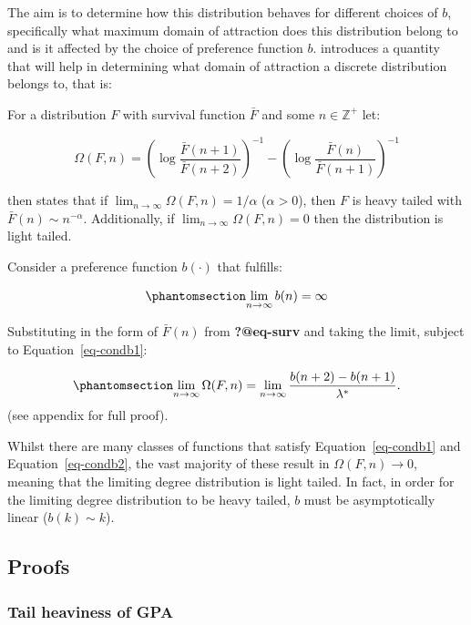 \documentclass[
  sn-basic,
]{sn-jnl}
\theoremstyle{plain}
\theoremstyle{remark}
\begin{document}
The aim is to determine how this distribution behaves for different
choices of \(b\), specifically what maximum domain of attraction does
this distribution belong to and is it affected by the choice of
preference function \(b\). \citet{shimura12} introduces a quantity that
will help in determining what domain of attraction a discrete
distribution belongs to, that is:

For a distribution \(F\) with survival function \(\bar F\) and some
\(n\in\mathbb Z^+\) let:

\[
\Omega(F,n) = \left(\log\displaystyle\frac{\bar F (n+1)}{\bar F (n+2)}\right)^{-1} - \left(\log\displaystyle\frac{\bar F (n)}{\bar F (n+1)}\right)^{-1}
\]

\citep{shimura12} then states that if
\(\lim_{n\rightarrow\infty} \Omega(F,n) = 1/\alpha\) (\(\alpha>0\)),
then \(F\) is heavy tailed with \(\bar F(n) \sim n^{-\alpha}\).
Additionally, if \(\lim_{n\rightarrow\infty} \Omega(F,n) = 0\) then the
distribution is light tailed.

Consider a preference function \(b(\cdot)\) that fulfills:

\begin{equation}\phantomsection\label{eq-condb1}{
\lim_{n\rightarrow \infty} b(n) = \infty
}\end{equation}

Substituting in the form of \(\bar F(n)\) from \textbf{?@eq-surv} and
taking the limit, subject to Equation~\ref{eq-condb1}:

\begin{equation}\phantomsection\label{eq-omegares}{
\lim_{n\rightarrow\infty}\Omega(F,n) = \lim_{n\rightarrow\infty}\frac{b(n+2)-b(n+1)}{\lambda^*}.
}\end{equation} (see appendix for full proof).

Whilst there are many classes of functions that satisfy
Equation~\ref{eq-condb1} and Equation~\ref{eq-condb2}, the vast majority
of these result in \(\Omega(F,n) \rightarrow 0\), meaning that the
limiting degree distribution is light tailed. In fact, in order for the
limiting degree distribution to be heavy tailed, \(b\) must be
asymptotically linear (\(b(k)\sim k\)).

\subsection{Proofs}\label{proofs}

\subsubsection{Tail heaviness of GPA}\label{tail-heaviness-of-gpa}
\end{document}
